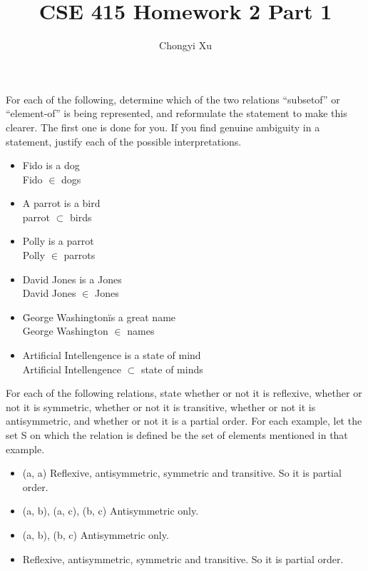 \documentclass[]{exam}
\title{}
\title{CSE 415 Homework 2 Part 1}
\author{Chongyi Xu}
\begin{document}
        
    \maketitle
    \begin{questions}
        \question For each of the following, determine which of the two relations “subsetof”
        or “element-of” is being represented, and reformulate the statement
        to make this clearer. The first one is done for you. If you find genuine
        ambiguity in a statement, justify each of the possible interpretations.
        \begin{itemize}
            \item Fido is a dog
            \\ Fido $\in$ dogs

            \item A parrot is a bird
            \\ parrot $\subset$ birds

            \item Polly is a parrot
            \\ Polly $\in$ parrots

            \item David Jones is a Jones
            \\ David Jones $\in$ Jones

            \item \"George Washington\" is a great name
            \\ George Washington $\in$ names

            \item Artificial Intellengence is a state of mind
            \\ Artificial Intellengence $\subset$ state of minds
        \end{itemize}

        \question For each of the following relations, state whether or not it is reflexive,
        whether or not it is symmetric, whether or not it is transitive, whether
        or not it is antisymmetric, and whether or not it is a partial order. For
        each example, let the set S on which the relation is defined be the set of
        elements mentioned in that example.
        \begin{itemize}
            \item {(a, a)}
            Reflexive, antisymmetric, symmetric and transitive. So it is partial order.
            \item {(a, b), (a, c), (b, c)}
            Antisymmetric only.
            \item {(a, b), (b, c)}
            Antisymmetric only.
            \item {}
            Reflexive, antisymmetric, symmetric and transitive. So it is partial order.            
        \end{itemize}
    \end{questions}
    
\end{document}
